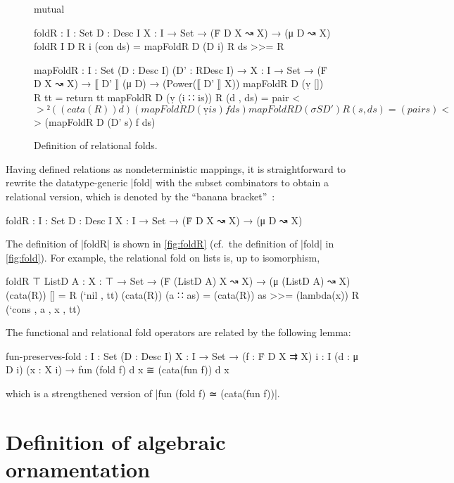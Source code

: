 \begin{figure}
\codefigure
\begin{code}
mutual

  foldR :  {I : Set} {D : Desc I} {X : I → Set} → (Ḟ D X ↝ X) → (μ D ↝ X)
  foldR {I} {D} R {i} (con ds) = mapFoldR D (D i) R ds >>= R

  mapFoldR :  {I : Set} (D : Desc I) (D' : RDesc I) →
              {X : I → Set} → (Ḟ D X ↝ X) → ⟦ D' ⟧ (μ D) → (Power(⟦ D' ⟧ X))
  mapFoldR D (ṿ [])        R tt         = return tt
  mapFoldR D (ṿ (i ∷ is))  R (d  , ds)  = pair <$>²  ((cata(R)) d)
                                                     (mapFoldR D (ṿ is) f ds)
  mapFoldR D (σ S D')      R (s  , ds)  = (pair s) <$> (mapFoldR D (D' s) f ds)
\end{code}
\caption{Definition of relational folds.}
\label{fig:foldR}
\end{figure}

Having defined relations as nondeterministic mappings, it is straightforward to rewrite the datatype-generic |fold| with the subset combinators to obtain a relational version, which is denoted by the ``banana bracket''~\citep{Meijer-bananas}:
\begin{code}
foldR :  {I : Set} {D : Desc I} {X : I → Set} → (Ḟ D X ↝ X) → (μ D ↝ X)
\end{code}
The definition of |foldR| is shown in \autoref{fig:foldR} (cf.~the definition of |fold| in \autoref{fig:fold}).
For example, the relational fold on lists is, up to isomorphism,
\begin{code}
foldR {⊤} {ListD A} :  {X : ⊤ → Set} →
                       (Ḟ (ListD A) X ↝ X) → (μ (ListD A) ↝ X)
(cata(R)) []        =   R (`nil , tt)
(cata(R)) (a ∷ as)  =   (cata(R)) as >>= (lambda(x)) R (`cons , a , x , tt)
\end{code}
The functional and relational fold operators are related by the following lemma:
\begin{code}
fun-preserves-fold :  {I : Set} (D : Desc I) {X : I → Set} →
                      (f : Ḟ D X ⇉ X) {i : I} (d : μ D i) (x : X i) →
                      fun (fold f) d x ≅ (cata(fun f)) d x
\end{code}
which is a strengthened version of |fun (fold f) ≃ (cata(fun f))|.

\section{Definition of algebraic ornamentation}
\label{sec:algOD}

